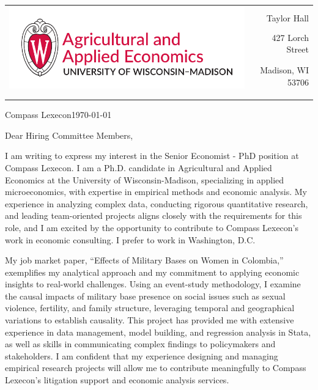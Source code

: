 \documentclass[12pt]{letter}
\begin{document}
\begin{tabularx}{\textwidth}{Xr}
\multirow{4}{*}{\includegraphics[height=3\baselineskip]{logo_cropped.pdf}} &  \\
& Taylor Hall \\
& 427 Lorch Street \\
& Madison, WI 53706 \\
[-1.8ex]\\
\\
\end{tabularx}

\newcommand{\compName}{Compass Lexecon}
\newcommand{\posName}{Senior Economist - PhD}

\compName \hfill \today \\

\medskip

Dear Hiring Committee Members,

I am writing to express my interest in the \posName \hspace{1mm} position at \compName. 
I am a Ph.D. candidate in Agricultural and Applied Economics at the University of Wisconsin-Madison, specializing in applied microeconomics, 
with expertise in empirical methods and economic analysis. My experience in analyzing complex data, conducting rigorous quantitative research, 
and leading team-oriented projects aligns closely with the requirements for this role, and I am excited by the opportunity to contribute 
to \compName's work in economic consulting. I prefer to work in Washington, D.C.

My job market paper, “Effects of Military Bases on Women in Colombia,” exemplifies my analytical approach and my commitment to 
applying economic insights to real-world challenges. Using an event-study methodology, I examine the causal impacts of military base presence 
on social issues such as sexual violence, fertility, and family structure, leveraging temporal and geographical variations to establish causality. 
This project has provided me with extensive experience in data management, model building, and regression analysis in Stata, as well as skills 
in communicating complex findings to policymakers and stakeholders. I am confident that my experience designing and managing empirical research projects 
will allow me to contribute meaningfully to \compName's litigation support and economic analysis services.
\end{document}
